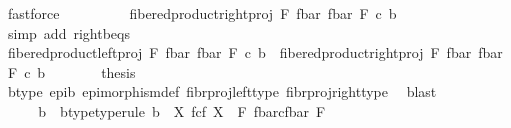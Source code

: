 \begin{isabellebody}
\ fastforce\isanewline
\ \ \ \ \isamarkupfalse%
\ \isamarkupfalse%
\ {\isachardoublequoteopen}{\isachardot}{\kern0pt}{\isachardot}{\kern0pt}{\isachardot}{\kern0pt}\ {\isacharequal}{\kern0pt}\ fibered{\isacharunderscore}{\kern0pt}product{\isacharunderscore}{\kern0pt}right{\isacharunderscore}{\kern0pt}proj\ F\ {\isacharparenleft}{\kern0pt}f{\isacharunderscore}{\kern0pt}bar{\isacharparenright}{\kern0pt}\ {\isacharparenleft}{\kern0pt}f{\isacharunderscore}{\kern0pt}bar{\isacharparenright}{\kern0pt}\ F\ {\isasymcirc}\isactrlsub c\ b{\isachardoublequoteclose}\isanewline
\ \ \ \ \ \ \isamarkupfalse%
\ {\isacharparenleft}{\kern0pt}simp\ add{\isacharcolon}{\kern0pt}\ right{\isacharunderscore}{\kern0pt}b{\isacharunderscore}{\kern0pt}eqs{\isacharparenright}{\kern0pt}\isanewline
\ \ \ \ \isamarkupfalse%
\ \isamarkupfalse%
\ {\isachardoublequoteopen}fibered{\isacharunderscore}{\kern0pt}product{\isacharunderscore}{\kern0pt}left{\isacharunderscore}{\kern0pt}proj\ F\ {\isacharparenleft}{\kern0pt}f{\isacharunderscore}{\kern0pt}bar{\isacharparenright}{\kern0pt}\ {\isacharparenleft}{\kern0pt}f{\isacharunderscore}{\kern0pt}bar{\isacharparenright}{\kern0pt}\ F\ {\isasymcirc}\isactrlsub c\ b\ {\isacharequal}{\kern0pt}\ fibered{\isacharunderscore}{\kern0pt}product{\isacharunderscore}{\kern0pt}right{\isacharunderscore}{\kern0pt}proj\ F\ {\isacharparenleft}{\kern0pt}f{\isacharunderscore}{\kern0pt}bar{\isacharparenright}{\kern0pt}\ {\isacharparenleft}{\kern0pt}f{\isacharunderscore}{\kern0pt}bar{\isacharparenright}{\kern0pt}\ F\ {\isasymcirc}\isactrlsub c\ b{\isachardoublequoteclose}\isacommand{{\isachardot}{\kern0pt}}\isamarkupfalse%
\isanewline
\ \ \ \ \isamarkupfalse%
\ \isamarkupfalse%
\ {\isacharquery}{\kern0pt}thesis\isanewline
\ \ \ \ \ \ \isamarkupfalse%
\ b{\isacharunderscore}{\kern0pt}type\ epi{\isacharunderscore}{\kern0pt}b\ epimorphism{\isacharunderscore}{\kern0pt}def{}\ fibr{\isacharunderscore}{\kern0pt}proj{\isacharunderscore}{\kern0pt}left{\isacharunderscore}{\kern0pt}type\ fibr{\isacharunderscore}{\kern0pt}proj{\isacharunderscore}{\kern0pt}right{\isacharunderscore}{\kern0pt}type\ \isamarkupfalse%
\ blast\isanewline
\ \ \isamarkupfalse%
\isanewline
\isanewline
\ \ \isanewline
\ \ \isanewline
\ \ \isamarkupfalse%
\ \isamarkupfalse%
\ b\ \ b{\isacharunderscore}{\kern0pt}type{\isacharbrackleft}{\kern0pt}type{\isacharunderscore}{\kern0pt}rule{\isacharbrackright}{\kern0pt}{\isacharcolon}{\kern0pt}\ {\isachardoublequoteopen}b\ {\isacharcolon}{\kern0pt}\ X\ \isactrlbsub f\isactrlesub {\isasymtimes}\isactrlsub c\isactrlbsub f\isactrlesub \ X\ {\isasymrightarrow}\ F\ \isactrlbsub {\isacharparenleft}{\kern0pt}f{\isacharunderscore}{\kern0pt}bar{\isacharparenright}{\kern0pt}\isactrlesub {\isasymtimes}\isactrlsub c\isactrlbsub {\isacharparenleft}{\kern0pt}f{\isacharunderscore}{\kern0pt}bar{\isacharparenright}{\kern0pt}\isactrlesub \ F{\isachardoublequoteclose}\ \isanewline

\end{isabellebody}
